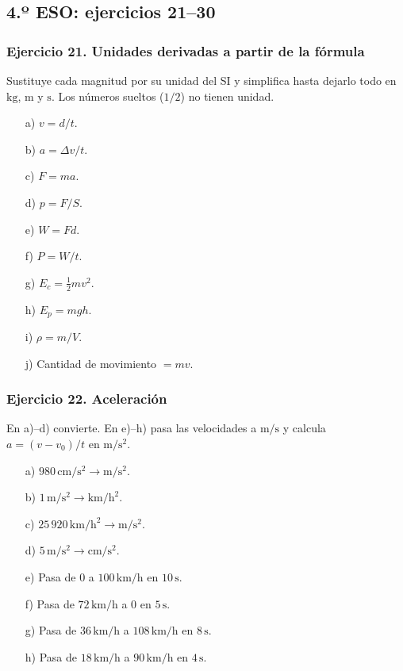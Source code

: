 \subsection{4.º ESO: ejercicios 21--30}

\subsubsection*{Ejercicio 21. Unidades derivadas a partir de la fórmula}

Sustituye cada magnitud por su unidad del SI y simplifica hasta dejarlo
todo en $\mathrm{kg}$, $\mathrm{m}$ y $\mathrm{s}$.
Los números sueltos ($1/2$) no tienen unidad.

\begin{enumerate}
    \item[a)] $v=d/t$.
    \item[b)] $a=\Delta v/t$.
    \item[c)] $F=ma$.
    \item[d)] $p=F/S$.
    \item[e)] $W=Fd$.
    \item[f)] $P=W/t$.
    \item[g)] $E_c=\frac{1}{2}mv^2$.
    \item[h)] $E_p=mgh$.
    \item[i)] $\rho=m/V$.
    \item[j)] Cantidad de movimiento $=mv$.
\end{enumerate}

\subsubsection*{Ejercicio 22. Aceleración}

En a)--d) convierte.
En e)--h) pasa las velocidades a $\mathrm{m/s}$
y calcula $a=(v-v_0)/t$ en $\mathrm{m/s^2}$.

\begin{enumerate}
    \item[a)] $980\,\mathrm{cm/s^2}\rightarrow\mathrm{m/s^2}$.
    \item[b)] $1\,\mathrm{m/s^2}\rightarrow\mathrm{km/h^2}$.
    \item[c)] $25\,920\,\mathrm{km/h^2}\rightarrow\mathrm{m/s^2}$.
    \item[d)] $5\,\mathrm{m/s^2}\rightarrow\mathrm{cm/s^2}$.
    \item[e)] Pasa de $0$ a $100\,\mathrm{km/h}$ en $10\,\mathrm{s}$.
    \item[f)] Pasa de $72\,\mathrm{km/h}$ a $0$ en $5\,\mathrm{s}$.
    \item[g)] Pasa de $36\,\mathrm{km/h}$ a $108\,\mathrm{km/h}$
    en $8\,\mathrm{s}$.
    \item[h)] Pasa de $18\,\mathrm{km/h}$ a $90\,\mathrm{km/h}$
    en $4\,\mathrm{s}$.
\end{enumerate}

